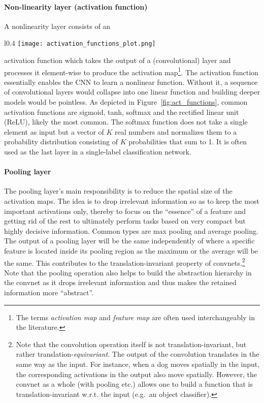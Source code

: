 \documentclass[a4paper,12pt]{report}
\begin{document}
\paragraph{Non-linearity layer (activation function)} A nonlinearity layer consists of an 
\begin{wrapfigure}{l}{0.4\textwidth}
\texttt{[image: activation\_functions\_plot.png]}
\caption{Common activation functions.}
\label{fig:act_functions}
\end{wrapfigure}
activation function which takes the output of a (convolutional) layer and processes it element-wise to produce the activation map\footnote{The terms \textit{activation map} and \textit{feature map} are often used interchangeably in the literature.}. The activation function essentially enables the CNN to learn a nonlinear function. Without it, a sequence of convolutional layers would collapse into one linear function and building deeper models would be pointless. As depicted in Figure~\ref{fig:act_functions}, common activation functions are sigmoid, tanh, softmax and the rectified linear unit (ReLU), likely the most common. The softmax function does not take a single element as input but a vector of $K$ real numbers and normalizes them to a probability distribution consisting of $K$ probabilities that sum to 1. It is often used as the last layer in a single-label classification network.

\paragraph{Pooling layer            } The pooling layer's main responsibility is to reduce the spatial size of the activation maps. The idea is to drop irrelevant information so as to keep the most important activations only, thereby to focus on the ``essence'' of a feature and getting rid of the rest to ultimately perform tasks based on very compact but highly decisive information. Common types are max pooling and average pooling. The output of a pooling layer will be the same independently of where a specific feature is located inside its pooling region as the maximum or the average will be the same. This contributes to the translation-invariant property of convnets.\footnote{Note that the convolution operation itself is not translation-invariant, but rather translation-\textit{equivariant}. The output of the convolution translates in the same way as the input. For instance, when a dog moves spatially in the input, the corresponding activations in the output also move spatially. However, the convnet as a whole  (with pooling etc.) allows one to build a function that is translation-invariant w.r.t. the input (e.g.\ an object classifier).} Note that the pooling operation also helps to build the abstraction hierarchy in the convnet as it drops irrelevant information and thus makes the retained information more ``abstract''. 
\end{document}
